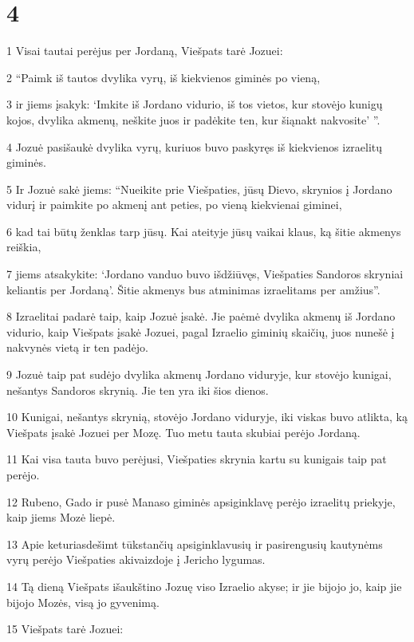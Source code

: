 \chapter{4}

\par 1 Visai tautai perėjus per Jordaną, Viešpats tarė Jozuei: 
\par 2 “Paimk iš tautos dvylika vyrų, iš kiekvienos giminės po vieną, 
\par 3 ir jiems įsakyk: ‘Imkite iš Jordano vidurio, iš tos vietos, kur stovėjo kunigų kojos, dvylika akmenų, neškite juos ir padėkite ten, kur šiąnakt nakvosite’ ”. 
\par 4 Jozuė pasišaukė dvylika vyrų, kuriuos buvo paskyręs iš kiekvienos izraelitų giminės. 
\par 5 Ir Jozuė sakė jiems: “Nueikite prie Viešpaties, jūsų Dievo, skrynios į Jordano vidurį ir paimkite po akmenį ant peties, po vieną kiekvienai giminei, 
\par 6 kad tai būtų ženklas tarp jūsų. Kai ateityje jūsų vaikai klaus, ką šitie akmenys reiškia, 
\par 7 jiems atsakykite: ‘Jordano vanduo buvo išdžiūvęs, Viešpaties Sandoros skryniai keliantis per Jordaną’. Šitie akmenys bus atminimas izraelitams per amžius”. 
\par 8 Izraelitai padarė taip, kaip Jozuė įsakė. Jie paėmė dvylika akmenų iš Jordano vidurio, kaip Viešpats įsakė Jozuei, pagal Izraelio giminių skaičių, juos nunešė į nakvynės vietą ir ten padėjo. 
\par 9 Jozuė taip pat sudėjo dvylika akmenų Jordano viduryje, kur stovėjo kunigai, nešantys Sandoros skrynią. Jie ten yra iki šios dienos. 
\par 10 Kunigai, nešantys skrynią, stovėjo Jordano viduryje, iki viskas buvo atlikta, ką Viešpats įsakė Jozuei per Mozę. Tuo metu tauta skubiai perėjo Jordaną. 
\par 11 Kai visa tauta buvo perėjusi, Viešpaties skrynia kartu su kunigais taip pat perėjo. 
\par 12 Rubeno, Gado ir pusė Manaso giminės apsiginklavę perėjo izraelitų priekyje, kaip jiems Mozė liepė. 
\par 13 Apie keturiasdešimt tūkstančių apsiginklavusių ir pasirengusių kautynėms vyrų perėjo Viešpaties akivaizdoje į Jericho lygumas. 
\par 14 Tą dieną Viešpats išaukštino Jozuę viso Izraelio akyse; ir jie bijojo jo, kaip jie bijojo Mozės, visą jo gyvenimą. 
\par 15 Viešpats tarė Jozuei: 
